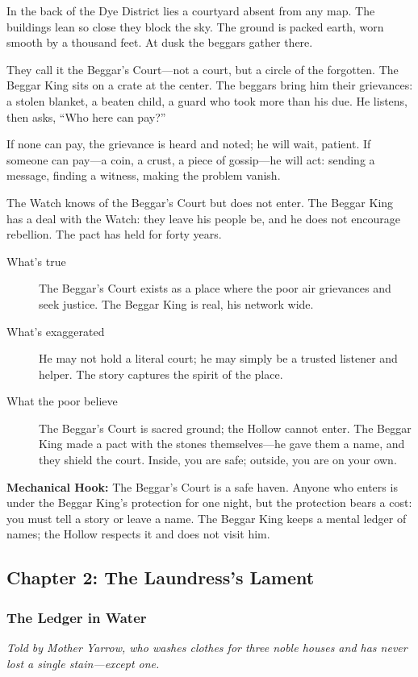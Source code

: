 \documentclass[11pt]{article}
\begin{document}
In the back of the Dye District lies a courtyard absent from any map. The buildings lean so close they block the sky. The ground is packed earth, worn smooth by a thousand feet. At dusk the beggars gather there.

They call it the Beggar's Court—not a court, but a circle of the forgotten. The Beggar King sits on a crate at the center. The beggars bring him their grievances: a stolen blanket, a beaten child, a guard who took more than his due. He listens, then asks, “Who here can pay?”

If none can pay, the grievance is heard and noted; he will wait, patient. If someone can pay—a coin, a crust, a piece of gossip—he will act: sending a message, finding a witness, making the problem vanish.

The Watch knows of the Beggar's Court but does not enter. The Beggar King has a deal with the Watch: they leave his people be, and he does not encourage rebellion. The pact has held for forty years.

\begin{description}
\item[What's true] The Beggar's Court exists as a place where the poor air grievances and seek justice. The Beggar King is real, his network wide.
\item[What's exaggerated] He may not hold a literal court; he may simply be a trusted listener and helper. The story captures the spirit of the place.
\item[What the poor believe] The Beggar's Court is sacred ground; the Hollow cannot enter. The Beggar King made a pact with the stones themselves—he gave them a name, and they shield the court. Inside, you are safe; outside, you are on your own.
\end{description}

\textbf{Mechanical Hook:} The Beggar's Court is a safe haven. Anyone who enters is under the Beggar King's protection for one night, but the protection bears a cost: you must tell a story or leave a name. The Beggar King keeps a mental ledger of names; the Hollow respects it and does not visit him.

\subsection{Chapter 2: The Laundress's Lament}
\subsubsection{The Ledger in Water}
\textit{Told by Mother Yarrow, who washes clothes for three noble houses and has never lost a single stain—except one.}
\end{document}
